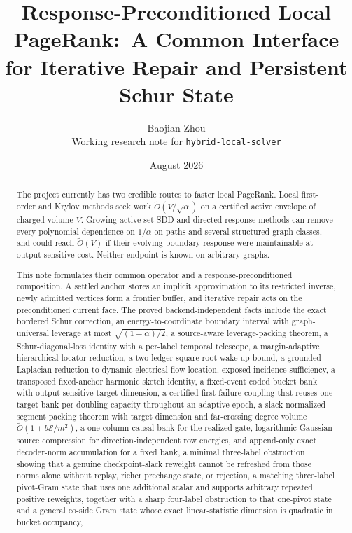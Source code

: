 \documentclass[11pt]{article}
\title{Response-Preconditioned Local PageRank:\
A Common Interface for Iterative Repair and Persistent Schur State}
\author{Baojian Zhou\\
\small Working research note for \texttt{hybrid-local-solver}}
\date{August 2026}
\begin{document}
\maketitle

\begin{abstract}
The project currently has two credible routes to faster local PageRank.  Local
first-order and Krylov methods seek work
$\widetilde O(V/\sqrt\alpha)$ on a certified active envelope of charged volume
$V$.  Growing-active-set SDD and directed-response methods can remove every
polynomial dependence on $1/\alpha$ on paths and several structured graph
classes, and could reach $\widetilde O(V)$ if their evolving boundary response
were maintainable at output-sensitive cost.  Neither endpoint is known on
arbitrary graphs.

This note formulates their common operator and a response-preconditioned
composition.  A settled anchor stores an implicit approximation to its
restricted inverse, newly admitted vertices form a frontier buffer, and
iterative repair acts on the preconditioned current face.  The proved
backend-independent facts include the exact bordered Schur correction, an
energy-to-coordinate boundary interval with graph-universal leverage at most
$\sqrt{(1-\alpha)/2}$, a source-aware leverage-packing theorem, a
Schur-diagonal-loss identity with a per-label temporal telescope, a
margin-adaptive hierarchical-locator reduction, a two-ledger square-root
wake-up bound, a grounded-Laplacian reduction to dynamic electrical-flow
location, exposed-incidence sufficiency, a transposed fixed-anchor harmonic
sketch identity, a fixed-event coded bucket bank with output-sensitive target
dimension, a certified first-failure coupling that reuses one target bank per
doubling capacity throughout an adaptive epoch, a slack-normalized segment
packing theorem with target dimension and far-crossing degree volume
$\widetilde O(1+b\mathcal E/m^2)$, a one-column causal bank for the realized
gate, logarithmic Gaussian source compression for direction-independent row
energies, and append-only exact decoder-norm accumulation for a fixed bank,
a minimal three-label obstruction showing that a genuine checkpoint-slack
reweight cannot be refreshed from those norms alone without replay, richer
prechange state, or rejection,
a matching three-label pivot-Gram state that uses one additional scalar and
supports arbitrary repeated positive reweights, together with a sharp
four-label obstruction to that one-pivot state and a general co-side Gram
state whose exact linear-statistic dimension is quadratic in bucket occupancy,

\end{abstract}
\end{document}
